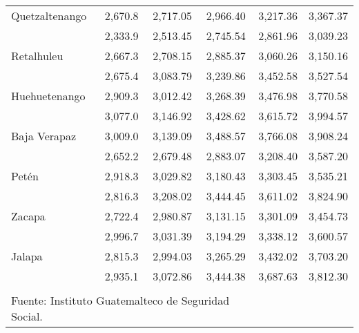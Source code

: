 {\begin{center}
\begin{spacing}{1.2}
\begin{tabular}{p{2.5cm}ccccc}
				\multicolumn{1}{l}{	Quetzaltenango	}&	 2,670.8 	 & 	2,717.05	 & 	2,966.40	 & 	3,217.36	 & 	 3,367.37 	 \\ 
				\rowcolor{color1!5!white}\multicolumn{1}{l}{	Suchitepéquez	}&	 2,333.9 	 & 	2,513.45	 & 	2,745.54	 & 	2,861.96	 & 	 3,039.23 	 \\ 
				\multicolumn{1}{l}{	Retalhuleu	}&	 2,667.3 	 & 	2,708.15	 & 	2,885.37	 & 	3,060.26	 & 	 3,150.16 	 \\ 
				\rowcolor{color1!5!white}\multicolumn{1}{l}{	San Marcos	}&	 2,675.4 	 & 	3,083.79	 & 	3,239.86	 & 	3,452.58	 & 	 3,527.54 	 \\ 
				\multicolumn{1}{l}{	Huehuetenango	}&	 2,909.3 	 & 	3,012.42	 & 	3,268.39	 & 	3,476.98	 & 	 3,770.58 	 \\ 
				\rowcolor{color1!5!white}\multicolumn{1}{l}{	Quiché	}&	 3,077.0 	 & 	3,146.92	 & 	3,428.62	 & 	3,615.72	 & 	 3,994.57 	 \\ 
				\multicolumn{1}{l}{	Baja Verapaz	}&	 3,009.0 	 & 	3,139.09	 & 	3,488.57	 & 	3,766.08	 & 	 3,908.24 	 \\ 
				\rowcolor{color1!5!white}\multicolumn{1}{l}{	Alta Verapaz	}&	 2,652.2 	 & 	2,679.48	 & 	2,883.07	 & 	3,208.40	 & 	 3,587.20 	 \\ 
				\multicolumn{1}{l}{	Petén	}&	 2,918.3 	 & 	3,029.82	 & 	3,180.43	 & 	3,303.45	 & 	 3,535.21 	 \\ 
				\rowcolor{color1!5!white}\multicolumn{1}{l}{	Izabal	}&	 2,816.3 	 & 	3,208.02	 & 	3,444.45	 & 	3,611.02	 & 	 3,824.90 	 \\ 
				\multicolumn{1}{l}{	Zacapa	}&	 2,722.4 	 & 	2,980.87	 & 	3,131.15	 & 	3,301.09	 & 	 3,454.73 	 \\ 
				\rowcolor{color1!5!white}\multicolumn{1}{l}{	Chiquimula	}&	 2,996.7 	 & 	3,031.39	 & 	3,194.29	 & 	3,338.12	 & 	 3,600.57 	 \\ 
				\multicolumn{1}{l}{	Jalapa	}&	 2,815.3 	 & 	2,994.03	 & 	3,265.29	 & 	3,432.02	 & 	 3,703.20 	 \\ 
				\rowcolor{color1!5!white}\multicolumn{1}{l}{	Jutiapa	}&	 2,935.1 	 & 	3,072.86	 & 	3,444.38	 & 	3,687.63	 & 	 3,812.30 	 \\ 
				\hline
				&&&\\[-0.36cm]
				\multicolumn{4}{l}{\footnotesize Fuente: Instituto Guatemalteco de Seguridad Social.}\\
			\end{tabular}\addtocounter{Cuadro}{1}
		\end{spacing}
	\end{center}
}





